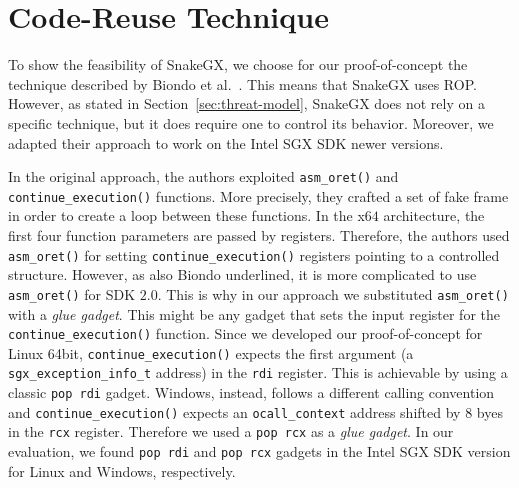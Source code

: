 \chapter{Code-Reuse Technique}
\label{ssec:my-rop-chain}
To show the feasibility of SnakeGX, we choose for our proof-of-concept
the technique described by Biondo et al.~\cite{biondo2018guard}.
This means that SnakeGX uses ROP. 
However, as stated in Section~\ref{sec:threat-model}, 
SnakeGX does not rely on a specific technique, but it does require one to 
control its behavior.
Moreover, we adapted their approach to work on the Intel SGX SDK newer versions.

In the original approach, the authors exploited \texttt{asm\_oret()} and 
\texttt{continue\_execution()} functions.
More precisely, they crafted a set of fake frame in order to create a loop between these functions.
In the x$64$ architecture, the first four function parameters are passed by registers.
Therefore, the authors used \texttt{asm\_oret()} for setting \texttt{continue\_execution()} registers pointing to a controlled structure.
However, as also Biondo underlined, it is more complicated to use 
\texttt{asm\_oret()} for SDK $2.0$.
This is why in our approach we substituted \texttt{asm\_oret()} with a 
\emph{glue gadget}.
This might be any gadget that sets the input register for the \texttt{continue\_execution()} function.
Since we developed our proof-of-concept for Linux 64bit, \texttt{continue\_execution()} expects the first argument
(\ie a \texttt{sgx\_exception\_info\_t} address) in the \texttt{rdi} register.
This is achievable by using a classic \texttt{pop rdi} gadget. 
Windows, instead, follows a different calling convention
and \texttt{continue\_execution()} expects an \texttt{ocall\_context} address shifted by $8$ byes in the \texttt{rcx} register.
Therefore we used a \texttt{pop rcx} as a \emph{glue gadget}.
In our evaluation, we found \texttt{pop rdi} and \texttt{pop 
rcx} gadgets in the Intel SGX SDK version for Linux and Windows, respectively.

